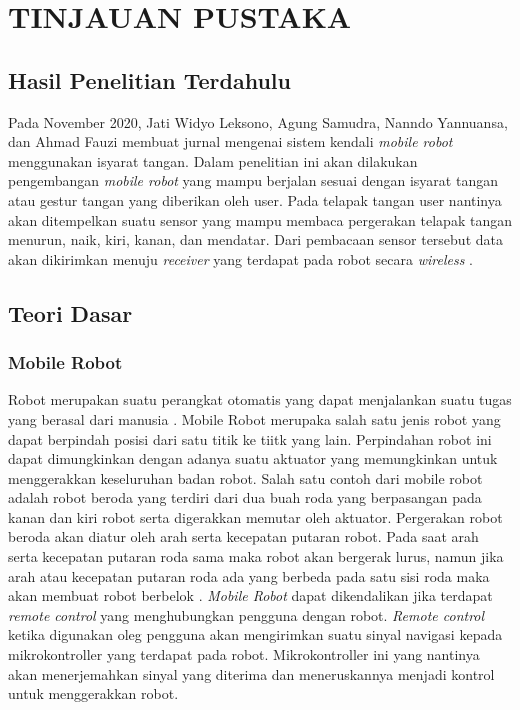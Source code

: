 \chapter{TINJAUAN PUSTAKA}

\section{Hasil Penelitian Terdahulu}
Pada November 2020, Jati Widyo Leksono, Agung Samudra, Nanndo Yannuansa, dan Ahmad Fauzi membuat jurnal mengenai sistem kendali \textit{mobile robot} menggunakan isyarat tangan. Dalam penelitian ini akan dilakukan pengembangan \textit{mobile robot} yang mampu berjalan sesuai dengan isyarat tangan atau gestur tangan yang diberikan oleh user. Pada telapak tangan user nantinya akan ditempelkan suatu sensor yang mampu membaca pergerakan telapak tangan menurun, naik, kiri, kanan, dan mendatar. Dari pembacaan sensor tersebut data akan dikirimkan menuju \textit{receiver} yang terdapat pada robot secara \textit{wireless} \parencite{JurnalElectroLuecat}.

\section{Teori Dasar}

\subsection{Mobile Robot}
Robot merupakan suatu perangkat otomatis yang dapat menjalankan suatu tugas yang berasal dari manusia \parencite{Desainrobot}.
Mobile Robot merupaka salah satu jenis robot yang dapat berpindah posisi dari satu titik ke tiitk yang lain. Perpindahan robot ini dapat dimungkinkan dengan adanya suatu aktuator yang memungkinkan untuk menggerakkan keseluruhan badan robot. Salah satu contoh dari mobile robot adalah robot beroda yang terdiri dari dua buah roda yang berpasangan pada kanan dan kiri robot serta digerakkan memutar oleh aktuator. Pergerakan robot beroda akan diatur oleh arah serta kecepatan putaran robot. Pada saat arah serta kecepatan putaran roda sama maka robot akan bergerak lurus, namun jika arah atau kecepatan putaran roda ada yang berbeda pada satu sisi roda maka akan membuat robot berbelok \parencite{mobilerobot}. \textit{Mobile Robot} dapat dikendalikan jika terdapat \textit{remote control} yang menghubungkan pengguna dengan robot. \textit{Remote control} ketika digunakan oleg pengguna akan mengirimkan suatu sinyal navigasi kepada mikrokontroller yang terdapat pada robot. Mikrokontroller ini yang nantinya akan menerjemahkan sinyal yang diterima dan meneruskannya menjadi kontrol untuk menggerakkan robot.


